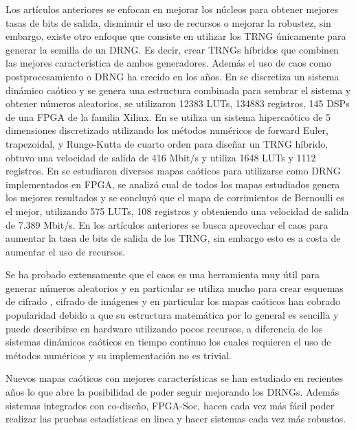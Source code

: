     Los artículos anteriores se enfocan en mejorar los núcleos para obtener mejores tasas de bits de salida, disminuir el uso de recursos o mejorar la robustez, sin embargo, existe otro enfoque que consiste en utilizar los TRNG únicamente para generar la semilla de un DRNG. Es decir, crear TRNGs híbridos que combinen las mejores característica de ambos generadores. Además el uso de caos como postprocesamiento o DRNG ha crecido en los años. En \cite{Liao2022} se discretiza un sistema dinámico caótico y se genera una estructura combinada para sembrar el sistema y obtener números aleatorios, se utilizaron 12383 LUTs, 134883 registros, 145 DSPs de una FPGA de la familia Xilinx. En \cite{Vaidyanathan2021} se utiliza un sistema hipercaótico de 5 dimensiones discretizado utilizando los métodos numéricos de forward Euler, trapezoidal, y Runge-Kutta de cuarto orden para diseñar un TRNG híbrido, obtuvo una velocidad de salida de 416 Mbit/s y utiliza 1648 LUTs y 1112 registros. En \cite{Fraga2017} se estudiaron diversos mapas caóticos para utilizarse como DRNG implementados en FPGA, se analizó cual de todos los mapas estudiados genera los mejores resultados y se concluyó que el mapa de corrimientos de Bernoulli es el mejor, utilizando 575 LUTs, 108 registros y obteniendo  una velocidad de salida de 7.389 Mbit/s. En los artículos anteriores se busca aprovechar el caos para aumentar la tasa de bits de salida de los TRNG, sin embargo esto es a costa de aumentar el uso de recursos. 

    Se ha probado extensamente que el caos es una herramienta muy útil para generar números aleatorios y en particular se utiliza mucho para crear esquemas de cifrado \cite{Wong2008,AlHazaimeh2017,Liu2020}, cifrado de imágenes \cite{Li2013, Sivaraman2020,Pareek2006,Kadir2010,Liu2016,Vaidyanathan2018,GarciaGuerrero2020} y en particular los mapas caóticos han cobrado popularidad debido a que su estructura matemática por lo general es sencilla y puede describirse en hardware utilizando pocos recursos, a diferencia de los sistemas dinámicos caóticos en tiempo continuo los cuales requieren el uso de métodos numéricos y su implementación no es trivial.

    Nuevos mapas caóticos \cite{GarciaGrimaldo2021} con mejores características se han estudiado en recientes años lo que abre la posibilidad de poder seguir mejorando los DRNGs. Además sistemas integrados con co-diseño, FPGA-Soc, \cite{HernandezMorales2022} hacen cada vez más fácil poder realizar las pruebas estadísticas en linea y hacer sistemas cada vez más robustos. 


